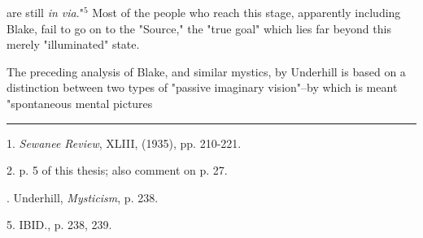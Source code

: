 are still \textit{in via}."$^{5}$ Most of the people who reach this stage, apparently
including Blake, fail to go on to the "Source,"
the "true goal" which lies far beyond this merely "illuminated" state.\par
\vspace*{0.5\baselineskip}
The preceding analysis of Blake, and similar mystics, by
Underhill is based on a distinction between two types of 
"passive imaginary vision"--by which is meant "spontaneous mental
pictures\linebreak
\null\par
\vspace*{-\baselineskip}
\vspace*{\fill}
\noindent\rule{0.25\textwidth}{0.4pt}\par
1. \textit{Sewanee Review}, XLIII, (1935), pp. 210-221.\par
2. p. 5 of this thesis; also comment on p. 27.\par
[3, 4]. Underhill, \textit{Mysticism}, p. 238.\par
5. IBID., p. 238, 239.\par

\newpage


